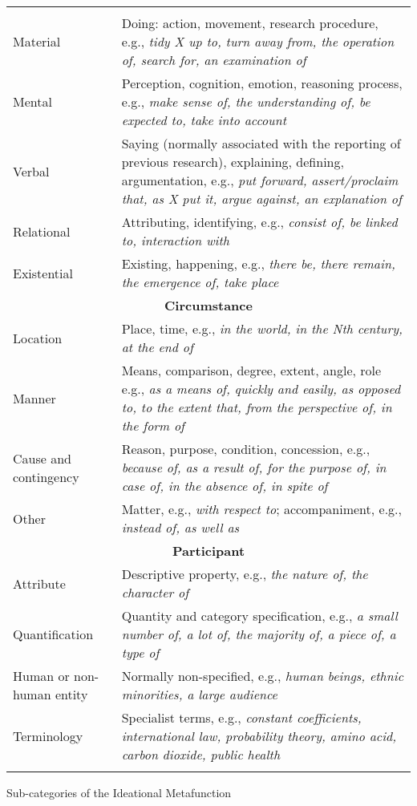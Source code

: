 \begin{tabularx}{\textwidth}{XX}

\lsptoprule

\multicolumn{2}{c}{\textbf{Process}}\\
Material & Doing: action, movement, research procedure, e.g., \textit{tidy X up to, turn away from, the operation of, search for, an examination of}\\
Mental & Perception, cognition, emotion, reasoning process, e.g., \textit{make sense of, the understanding of, be expected to, take into account}\\
Verbal & Saying (normally associated with the reporting of previous research), explaining, defining, argumentation, e.g., \textit{put forward, assert/proclaim that, as X put it, argue against, an explanation of}\\
Relational & Attributing, identifying, e.g., \textit{consist of, be linked to, interaction with}\\
Existential & Existing, happening, e.g., \textit{there be, there remain, the emergence of, take place}\\
\multicolumn{2}{c}{\textbf{Circumstance}}\\
Location & Place, time, e.g., \textit{in the world, in the Nth century, at the end of}\\
Manner & Means, comparison, degree, extent, angle, role e.g., \textit{as a means of, quickly and easily, as opposed to, to the extent that, from the perspective of, in the form of}\\
Cause and contingency & Reason, purpose, condition, concession, e.g., \textit{because of, as a result of, for the purpose of, in case of, in the absence of, in spite of}\\
Other & Matter, e.g., \textit{with respect to}; accompaniment, e.g., \textit{instead of, as well as}\\
\multicolumn{2}{c}{\textbf{Participant}}\\
Attribute & Descriptive property, e.g., \textit{the nature of, the character of}\\
Quantification & Quantity and category specification, e.g., \textit{a small number of, a lot of, the majority of, a piece of, a type of}\\
Human or non-human entity & Normally non-specified, e.g., \textit{human beings, ethnic minorities, a large audience}\\
Terminology & Specialist terms, e.g., \textit{constant coefficients, international law, probability theory, amino acid, carbon dioxide, public health} \\
\lspbottomrule
\end{tabularx}
\begin{table}
\caption{Sub-categories of the Ideational Metafunction}
\label{tab:key:2}
\end{table}

